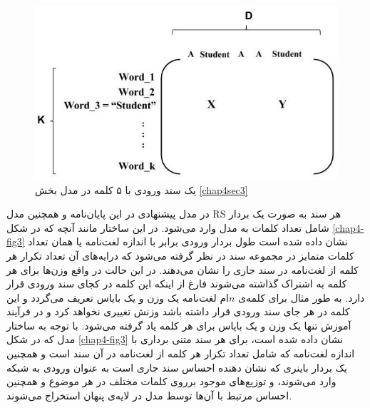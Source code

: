 \begin{figure}[!t]
	\centering
	\includegraphics[scale=0.4]{chap4-img/example}
	\caption{یک سند ورودی با ۵ کلمه در مدل بخش \ref{chap4sec3}}
	\label{chap4-fig4}
\end{figure}

در مدل پیشنهادی در این پایان‌‌نامه و همچنین مدل
RS
هر سند به صورت یک بردار شامل تعداد کلمات به مدل وارد می‌‌شود. در این ساختار مانند آنچه که در شکل
\ref{chap4-fig3}
نشان داده شده است طول بردار ورودی برابر با اندازه لغت‌نامه یا همان تعداد کلمات متمایز در مجموعه سند در نظر گرفته می‌‌شود که درایه‌های آن تعداد تکرار هر کلمه از لغت‌نامه در سند جاری را نشان می‌‌دهند. در این حالت در واقع وزن‌ها برای هر کلمه به اشتراک گذاشته می‌‌شوند فارغ از اینکه این کلمه در کجای سند ورودی قرار دارد. به طور مثال برای کلمه‌ی‌
$n$ام 
لغت‌نامه یک وزن و یک بایاس تعریف می‌‌گردد و این کلمه در هر جای سند ورودی قرار داشته باشد وزنش تغییری نخواهد کرد و در فرآیند آموزش تنها یک وزن و یک بایاس برای هر کلمه یاد گرفته می‌‌شود. با توجه به ساختار مدل که در شکل
\ref{chap4-fig3}
نشان داده شده است، برای هر سند متنی برداری با اندازه لغت‌نامه که شامل تعداد تکرار هر کلمه از لغت‌نامه در آن سند است و همچنین یک بردار باینری که نشان دهنده احساس سند جاری است به عنوان ورودی به شبکه وارد می‌‌شوند، و توزیع‌های موجود برروی کلمات مختلف در هر موضوع و همچنین احساس مرتبط با آن‌ها توسط مدل در لایه‌‌ی پنهان استخراج می‌‌شوند.

